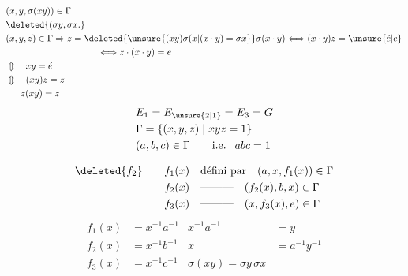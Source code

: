 \[
\begin{aligned}
&(x,y,\sigma(xy))\in\Gamma\\
&\deleted{(\sigma y,\sigma x.}\\
&(x,y,z)\in\Gamma\Rightarrow z=\deleted{\unsure{(xy)\sigma(x|(x\cdot y)=\sigma x}}\sigma(x\cdot y)
\Longleftrightarrow(x\cdot y)z=\unsure{\acute e|e}\\
&\hspace{10em}\Longleftrightarrow z\cdot(x\cdot y)=e\\
&\Updownarrow\quad xy=\acute e\\
&\Updownarrow\quad(xy)z=z\\
&\phantom{\Updownarrow\quad}z(xy)=z
\end{aligned}
\]
\[
\begin{aligned}
&E_1=E_{\unsure{2|1}}=E_3=G\\
&\Gamma=\{(x,y,z)\mid xyz=1\}\\
&(a,b,c)\in\Gamma\qquad\text{i.e. }\ abc=1
\end{aligned}
\]

\[
\begin{aligned}
\deleted{f_2}\qquad f_1(x)&\quad\text{défini par}\quad (a,x,f_1(x))\in\Gamma\\
f_2(x)&\quad\text{---------}\quad(f_2(x),b,x)\in\Gamma\\
f_3(x)&\quad\text{---------}\quad(x,f_3(x),e)\in\Gamma
\end{aligned}
\]
\[
\begin{aligned}
f_1(x)&=x^{-1}a^{-1}&x^{-1}a^{-1}&=y\\
f_2(x)&=x^{-1}b^{-1}&x&=a^{-1}y^{-1}\\
f_3(x)&=x^{-1}c^{-1}&\boxed{\sigma(xy)=\sigma y\,\sigma x}
\end{aligned}
\]

